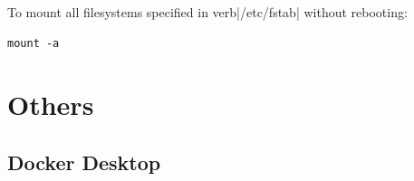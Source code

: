 \documentclass{article}
\newenvironment{codetemplate}[1][]{%
  \mybasecolorbox[#1]
  \itshape
}{%
  \endmybasecolorbox
}
\begin{document}
To mount all filesystems specified in verb|/etc/fstab| without rebooting:
\begin{codetemplate}
\begin{verbatim}
mount -a
\end{verbatim}
\end{codetemplate}



\newpage
\section{Others}

\subsection{Docker Desktop}
\end{document}
